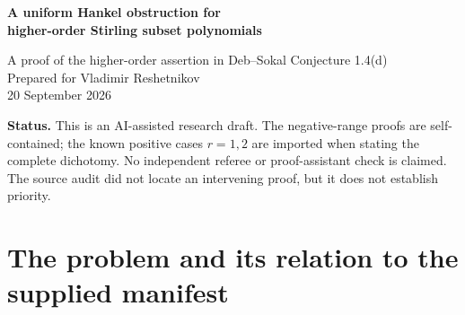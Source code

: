 \documentclass[11pt,a4paper]{article}
\theoremstyle{definition}
\numberwithin{equation}{section}
\begin{document}
\begin{center}
{\LARGE\bfseries\color{Ink} A uniform Hankel obstruction for\\[0.18em]
higher-order Stirling subset polynomials\par}
\vspace{0.8em}
{\large A proof of the higher-order assertion in Deb--Sokal Conjecture 1.4(d)}\\[0.9em]
{Prepared for Vladimir Reshetnikov}\\[0.3em]
{20 September 2026}
\end{center}

\begin{abstract}
Let $S^{(r)}_{n,k}$ count partitions of $n+(r-1)k$ labels into $k$ blocks,
each of size at least $r$, and put $s_{r,n}(x)=\sum_k S^{(r)}_{n,k}x^k$.
For every integer $r\ge3$ we prove that this polynomial sequence is not
coefficientwise Hankel-totally positive. More strongly, every adjacent
$3\times3$ Hankel determinant with positive shift has a negative coefficient
of $x^5$, and all its lower coefficients vanish. For shift one, the coefficient is
\[
-\binom{2r-1}{r-1}^{\!2}
 \frac{(r-2)(r-1)(r^2+11r+6)}{(r+1)(r+2)^2(r+3)}.
\]
The proof reduces a rank-one perturbation determinant to the second
differences of the two-block counting sequence. Those differences are a
geometric sequence minus a partial binomial sum; an elementary ratio
argument determines the sign uniformly. This proves the previously
conjectured negative range of Deb--Sokal Conjecture~1.4(d), using the
shift-one witness already suggested by its authors. We also obtain exact
formulas for arbitrary shifts, quantitative negative bounds, small-parameter
obstructions to both Stieltjes and Hamburger moment representations, and
asymptotic formulas. The accompanying code supplies independent
exact-arithmetic checks, not a replacement for the proofs.
\end{abstract}

\medskip
\noindent\textbf{Status.}
This is an AI-assisted research draft. The negative-range proofs are
self-contained; the known positive cases $r=1,2$ are imported when stating
the complete dichotomy. No independent referee or proof-assistant check is
claimed. The source audit did not locate an intervening proof, but it does
not establish priority.

\setcounter{tocdepth}{1}
\makeatletter
\renewcommand*\l@section{\@dottedtocline{1}{0em}{1.5em}}
\makeatother
\tableofcontents
\clearpage

\section{The problem and its relation to the supplied manifest}
\end{document}
